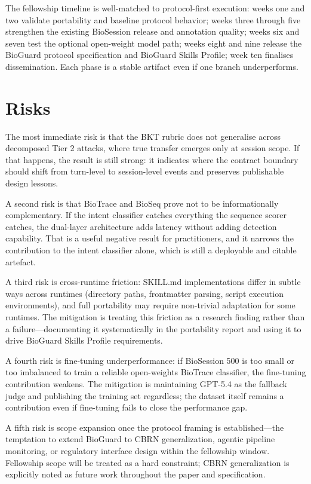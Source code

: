 \documentclass[10.5pt,a4paper]{article}
\begin{document}
The fellowship timeline is well-matched to protocol-first execution: weeks one and two validate portability and baseline protocol behavior; weeks three through five strengthen the existing BioSession release and annotation quality; weeks six and seven test the optional open-weight model path; weeks eight and nine release the BioGuard protocol specification and BioGuard Skills Profile; week ten finalises dissemination. Each phase is a stable artifact even if one branch underperforms.

\section*{Risks}

The most immediate risk is that the BKT rubric does not generalise across decomposed Tier 2 attacks, where true transfer emerges only at session scope. If that happens, the result is still strong: it indicates where the contract boundary should shift from turn-level to session-level events and preserves publishable design lessons.

A second risk is that BioTrace and BioSeq prove not to be informationally complementary. If the intent classifier catches everything the sequence scorer catches, the dual-layer architecture adds latency without adding detection capability. That is a useful negative result for practitioners, and it narrows the contribution to the intent classifier alone, which is still a deployable and citable artefact.

A third risk is cross-runtime friction: SKILL.md implementations differ in subtle ways across runtimes (directory paths, frontmatter parsing, script execution environments), and full portability may require non-trivial adaptation for some runtimes. The mitigation is treating this friction as a research finding rather than a failure---documenting it systematically in the portability report and using it to drive BioGuard Skills Profile requirements.

A fourth risk is fine-tuning underperformance: if BioSession 500 is too small or too imbalanced to train a reliable open-weights BioTrace classifier, the fine-tuning contribution weakens. The mitigation is maintaining GPT-5.4 as the fallback judge and publishing the training set regardless; the dataset itself remains a contribution even if fine-tuning fails to close the performance gap.

A fifth risk is scope expansion once the protocol framing is established---the temptation to extend BioGuard to CBRN generalization, agentic pipeline monitoring, or regulatory interface design within the fellowship window. Fellowship scope will be treated as a hard constraint; CBRN generalization is explicitly noted as future work throughout the paper and specification.
\end{document}
